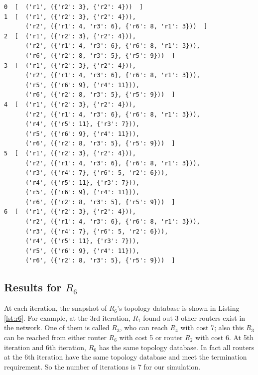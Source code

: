 \documentclass[12pt]{article}  %
\theoremstyle{definition}
\theoremstyle{remark}
\begin{document}
\begin{lstlisting}
0  [  ('r1', ({'r2': 3}, {'r2': 4}))  ]
1  [  ('r1', ({'r2': 3}, {'r2': 4})),
      ('r2', ({'r1': 4, 'r3': 6}, {'r6': 8, 'r1': 3}))  ]
2  [  ('r1', ({'r2': 3}, {'r2': 4})),
      ('r2', ({'r1': 4, 'r3': 6}, {'r6': 8, 'r1': 3})),
      ('r6', ({'r2': 8, 'r3': 5}, {'r5': 9}))  ]
3  [  ('r1', ({'r2': 3}, {'r2': 4})),
      ('r2', ({'r1': 4, 'r3': 6}, {'r6': 8, 'r1': 3})),
      ('r5', ({'r6': 9}, {'r4': 11})),
      ('r6', ({'r2': 8, 'r3': 5}, {'r5': 9}))  ]
4  [  ('r1', ({'r2': 3}, {'r2': 4})),
      ('r2', ({'r1': 4, 'r3': 6}, {'r6': 8, 'r1': 3})),
      ('r4', ({'r5': 11}, {'r3': 7})),
      ('r5', ({'r6': 9}, {'r4': 11})),
      ('r6', ({'r2': 8, 'r3': 5}, {'r5': 9}))  ]
5  [  ('r1', ({'r2': 3}, {'r2': 4})),
      ('r2', ({'r1': 4, 'r3': 6}, {'r6': 8, 'r1': 3})),
      ('r3', ({'r4': 7}, {'r6': 5, 'r2': 6})),
      ('r4', ({'r5': 11}, {'r3': 7})),
      ('r5', ({'r6': 9}, {'r4': 11})),
      ('r6', ({'r2': 8, 'r3': 5}, {'r5': 9}))  ]
6  [  ('r1', ({'r2': 3}, {'r2': 4})),
      ('r2', ({'r1': 4, 'r3': 6}, {'r6': 8, 'r1': 3})),
      ('r3', ({'r4': 7}, {'r6': 5, 'r2': 6})),
      ('r4', ({'r5': 11}, {'r3': 7})),
      ('r5', ({'r6': 9}, {'r4': 11})),
      ('r6', ({'r2': 8, 'r3': 5}, {'r5': 9}))  ]
\end{lstlisting}


\subsection{Results for $R_6$}
At each iteration, the snapshot of $R_6$'s topology database is shown in Listing \ref{lst:r6}.
For example, at the 3rd iteration, $R_1$ found out 3 other routers exist in the network.
One of them is called $R_3$, who can reach $R_4$ with cost 7;
also this $R_3$ can be reached from either router $R_6$ with cost 5 or router $R_2$ with cost 6.
At 5th iteration and 6th iteration, $R_6$ has the same topology database.
In fact all routers at the 6th iteration have the same topology database and meet the termination requirement.
So the number of iterations is 7 for our simulation.
\end{document}
